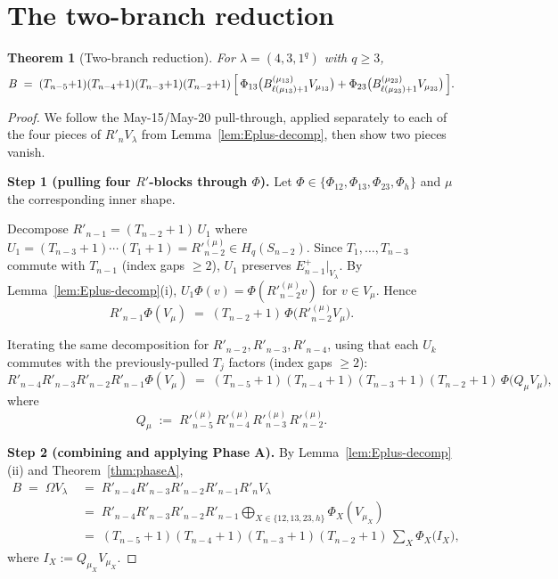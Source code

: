 \documentclass[11pt]{article}
\newtheorem{theorem}{Theorem}
\theoremstyle{definition}
\newcommand{\Hq}{H_q}
\newcommand{\Om}{\Omega}
\newcommand{\Rp}{{R'}}
\begin{document}
\section{The two-branch reduction}\label{sec:reduction}

\begin{theorem}[Two-branch reduction]\label{thm:reduction}
For $\lambda = (4, 3, 1^q)$ with $q \ge 3$,
\begin{equation}\label{eq:reduction}
   B \;=\; (T_{n-5}{+}1)(T_{n-4}{+}1)(T_{n-3}{+}1)(T_{n-2}{+}1)\,
   \Bigl[\,\Phi_{13}\bigl(B_{\ell(\mu_{13})+1}^{(\mu_{13})} V_{\mu_{13}}\bigr)
        + \Phi_{23}\bigl(B_{\ell(\mu_{23})+1}^{(\mu_{23})} V_{\mu_{23}}\bigr)
   \,\Bigr].
\end{equation}
\end{theorem}

\begin{proof}
We follow the May-15/May-20 pull-through, applied separately to each
of the four pieces of $\Rp_n V_\lambda$ from
Lemma~\ref{lem:Eplus-decomp}, then show two pieces vanish.

\medskip\textbf{Step 1 (pulling four $\Rp$-blocks through $\Phi$).}
Let $\Phi \in \{\Phi_{12}, \Phi_{13}, \Phi_{23}, \Phi_h\}$ and $\mu$ the
corresponding inner shape.

Decompose $\Rp_{n-1} = (T_{n-2}+1)\,U_1$ where $U_1 = (T_{n-3}+1)\cdots
(T_1+1) = \Rp_{n-2}^{(\mu)} \in \Hq(S_{n-2})$.  Since $T_1, \ldots,
T_{n-3}$ commute with $T_{n-1}$ (index gaps $\ge 2$), $U_1$ preserves
$E_{n-1}^+|_{V_\lambda}$.  By
Lemma~\ref{lem:Eplus-decomp}(i), $U_1 \Phi(v) = \Phi(\Rp_{n-2}^{(\mu)} v)$
for $v \in V_\mu$.  Hence
\[
   \Rp_{n-1}\Phi(V_\mu)
   \;=\; (T_{n-2}+1)\,\Phi\bigl(\Rp_{n-2}^{(\mu)} V_\mu\bigr).
\]

Iterating the same decomposition for $\Rp_{n-2}, \Rp_{n-3}, \Rp_{n-4}$,
using that each $U_k$ commutes with the previously-pulled $T_j$
factors (index gaps $\ge 2$):
\begin{equation}\label{eq:branchpull}
   \Rp_{n-4}\Rp_{n-3}\Rp_{n-2}\Rp_{n-1}\Phi(V_\mu)
   \;=\; (T_{n-5}+1)(T_{n-4}+1)(T_{n-3}+1)(T_{n-2}+1)\,
   \Phi\bigl(Q_\mu V_\mu\bigr),
\end{equation}
where
\[
   Q_\mu \;:=\; \Rp_{n-5}^{(\mu)}\, \Rp_{n-4}^{(\mu)}\, \Rp_{n-3}^{(\mu)}\, \Rp_{n-2}^{(\mu)}.
\]

\medskip\textbf{Step 2 (combining and applying Phase A).}
By Lemma~\ref{lem:Eplus-decomp}(ii) and Theorem~\ref{thm:phaseA},
\begin{align*}
   B \;=\; \Om V_\lambda
   &\;=\; \Rp_{n-4}\Rp_{n-3}\Rp_{n-2}\Rp_{n-1} \Rp_n V_\lambda \\
   &\;=\; \Rp_{n-4}\Rp_{n-3}\Rp_{n-2}\Rp_{n-1}
      \!\!\!\bigoplus_{X \in \{12,13,23,h\}}\!\!\!\Phi_X(V_{\mu_X}) \\
   &\;=\; (T_{n-5}{+}1)(T_{n-4}{+}1)(T_{n-3}{+}1)(T_{n-2}{+}1)\,
        \sum_{X}\Phi_X\bigl(I_X\bigr),
\end{align*}
where $I_X := Q_{\mu_X} V_{\mu_X}$.


\end{proof}
\end{document}

